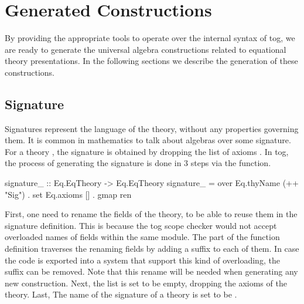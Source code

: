 
\section{Generated Constructions}
\label{sec:generatedConstructions}
By providing the appropriate tools to operate over the internal syntax of tog, we are ready to generate the universal algebra constructions related to equational theory presentations. In the following sections we describe the generation of these constructions. 

\subsection{Signature}
Signatures represent the language of the theory, without any properties governing them. It is common in mathematics to talk about algebras over some signature. 
For a theory , the signature is obtained by dropping the list of axioms . In tog, the process of generating the signature is done in $3$ steps via the  function. 
\begin{hscode}
signature_ :: Eq.EqTheory -> Eq.EqTheory
signature_ = over Eq.thyName (++ "Sig") . set Eq.axioms [] .  gmap ren
\end{hscode}
First, one need to rename the fields of the theory, to be able to reuse them in the signature definition. This is because the tog scope checker would not accept overloaded names of fields within the same module. The  part of the function definition traverses the  renaming fields by adding a suffix  to each of them. In case the code is exported into a system that support this kind of overloading, the suffix can be removed. Note that this rename will be needed when generating any new construction. 
Next, the  list is set to be empty, dropping the axioms of the theory. 
Last, The name of the signature of a theory  is set to be . 

